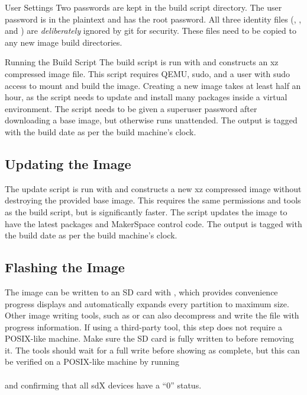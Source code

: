 \begin{subsubsec}{User Settings}
    Two passwords are kept in the build script directory.
    The user password is in the plaintext  and  has the root password.
    All three identity files (, , and ) are \emph{deliberately} ignored by git for security.
    These files need to be copied to any new image build directories.
\end{subsubsec}

\begin{subsubsec}{Running the Build Script}
    The build script is run with  and constructs an xz compressed image file.
    This script requires QEMU, sudo, and a user with sudo access to mount and build the image.
    Creating a new image takes at least half an hour,
        as the script needs to update and install many packages inside a virtual environment.
    The script needs to be given a superuser password after downloading a base image,
        but otherwise runs unattended.
    The output is tagged with the build date as per the build machine's clock.
\end{subsubsec}

\subsection{Updating the Image}
    The update script is run with  and constructs a new xz compressed image without destroying the provided base image.
    This requires the same permissions and tools as the build script,
        but is significantly faster.
    The script updates the image to have the latest packages and MakerSpace control code.
    The output is tagged with the build date as per the build machine's clock.
    
\subsection{Flashing the Image}
    The image can be written to an SD card with ,
        which provides convenience progress displays and automatically expands every partition to maximum size.
    Other image writing tools, such as  or  can also decompress and write the file with progress information.
    If using a third-party tool,
        this step does not require a POSIX-like machine.
    Make sure the SD card is fully written to before removing it.
    The tools should wait for a full write before showing as complete,
        but this can be verified on a POSIX-like machine by running \\
        \hspace*{2em}  \\
        and confirming that all sdX devices have a ``0'' status.

